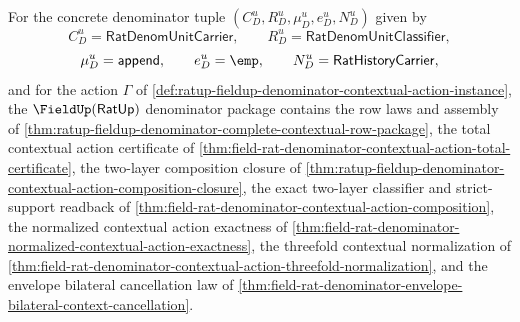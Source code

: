 \begin{theorem}
\label{thm:ratup-fieldup-denominator-contextual-row-closure-package}
For the concrete denominator tuple
$(C_D^u,R_D^u,\mu_D^u,e_D^u,N_D^u)$ given by
$$
C_D^u=\mathsf{RatDenomUnitCarrier},\qquad
R_D^u=\mathsf{RatDenomUnitClassifier},
$$
$$
\mu_D^u=\mathsf{append},\qquad
e_D^u=\emp,\qquad
N_D^u=\mathsf{RatHistoryCarrier},
$$
and for the action $\Gamma$ of
\autoref{def:ratup-fieldup-denominator-contextual-action-instance}, the
$\FieldUp(\mathsf{RatUp})$ denominator package contains the row laws and
assembly of
\autoref{thm:ratup-fieldup-denominator-complete-contextual-row-package}, the
total contextual action certificate of
\autoref{thm:field-rat-denominator-contextual-action-total-certificate}, the
two-layer composition closure of
\autoref{thm:ratup-fieldup-denominator-contextual-action-composition-closure},
the exact two-layer classifier and strict-support readback of
\autoref{thm:field-rat-denominator-contextual-action-composition}, the
normalized contextual action exactness of
\autoref{thm:field-rat-denominator-normalized-contextual-action-exactness},
the threefold contextual normalization of
\autoref{thm:field-rat-denominator-contextual-action-threefold-normalization},
and the envelope bilateral cancellation law of
\autoref{thm:field-rat-denominator-envelope-bilateral-context-cancellation}.
\end{theorem}
